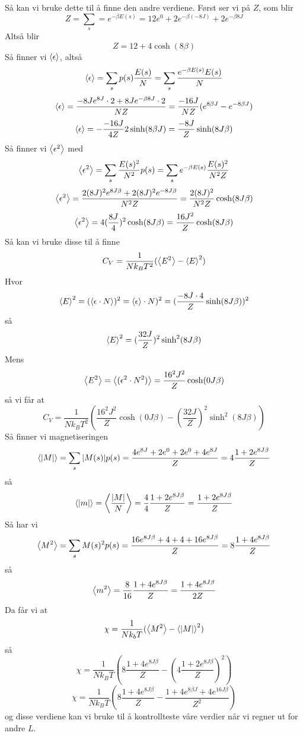 \documentclass[reprint,english,notitlepage]{revtex4-2}  %
\begin{document}
Så kan vi bruke dette til å finne den andre verdiene. Først ser vi på $Z$, som blir 
$$
Z=\sum_s=e^{-\beta E(s)}=12 e^{0}+2e^{-\beta (-8J)}+2e^{-\beta 8J}$$
Altså blir $$Z=12+4\cosh(8\beta)
$$
Så finner vi $\expval{\epsilon}$, altså
$$
\expval{\epsilon}=\sum_{s}p(s)\frac{E(s)}{N}=\sum_{s}\frac{e^{-\beta E(s)}E(s)}{N}
$$
$$
\expval{\epsilon}=\frac{-8Je^{8J}\cdot 2 + 8Je^{-\beta 8J}\cdot 2}{NZ}=\frac{-16J}{NZ}(e^{8\beta J}-e^{-8\beta J})$$$$\expval{\epsilon}=-\frac{-16 J}{4Z}2\sinh(8\beta J)=\frac{-8J}{Z}\sinh(8J\beta)
$$
Så finner vi $\expval{\epsilon^2}$ med 
$$
\expval{\epsilon^2}=\sum_{s}\frac{E(s)^2}{N^2}p(s)=\sum_{s}e^{-\beta E(s)}\frac{E(s)^2}{N^2Z}
$$
$$
\expval{\epsilon^2}=\frac{2(8J)^2e^{8J\beta}+2(8J)^2e^{-8J\beta}}{N^2Z}=\frac{2(8J)^2}{N^2Z}\cosh(8J\beta)
$$
$$
\expval{\epsilon^2}=4(\frac{8J}{4})^2\cosh(8J\beta)=\frac{16J^2}{Z}\cosh(8J\beta)
$$
Så kan vi bruke disse til å finne
$$
C_V=\frac{1}{Nk_BT^2}(\expval{E^2}-\expval{E}^2)
$$
Hvor 
$$\expval{E}^2=(\expval{\epsilon\cdot N})^2=\expval{\epsilon}\cdot N)^2=(\frac{-8J\cdot 4}{Z}\sinh(8J\beta))^2$$så $$\expval{E}^2=(\frac{32J}{Z})^2\sinh^2(8J\beta)
$$
Mens
$$
\expval{E^2}=\expval{(\epsilon^2\cdot N^2)}=\frac{16^2J^2}{Z}\cosh(0J\beta)
$$
så vi får at
$$
C_V=\frac{1}{Nk_BT^2}(\frac{16^2J^2}{Z}\cosh(0J\beta)-(\frac{32J}{Z})^2\sinh^2(8J\beta))
$$
Så finner vi magnetiseringen
$$
\expval{|M|}=\sum_s |M(s)|p(s)=\frac{4e^{8J}+2e^0 +2e^0 +4e^{8J}}{Z}=4\frac{1+2e^{8J\beta}}{Z}
$$
så 
$$
\expval{|m|}=\expval{\frac{|M|}{N}}=\frac{4}{4}\frac{1+2e^{8J\beta}}{Z}=\frac{1+2e^{8J\beta}}{Z}
$$
Så har vi
$$
\expval{M^2}=\sum_s M(s)^2p(s)=\frac{16e^{8J\beta}+4+4+16e^{8J\beta}}{Z}=8\frac{1+4e^{8J\beta}}{Z}
$$
så
$$
\expval{m^2}=\frac{8}{16}\frac{1+4e^{8J\beta}}{Z}=\frac{1+4e^{8J\beta}}{2Z}
$$
Da får vi at
$$
\chi=\frac{1}{Nk_bT}(\expval{M^2}-\expval{|M|}^2)
$$
så 
$$
\chi=\frac{1}{Nk_BT}(8\frac{1+4e^{8J\beta}}{Z}-(4\frac{1+2e^{8J\beta}}{Z})^2)
$$
$$
\chi=\frac{1}{Nk_BT}(8\frac{1+4e^{8J\beta}}{Z}-\frac{1+4e^{8\beta J}+4e^{16J\beta}}{Z^2})
$$
og disse verdiene kan vi bruke til å kontrollteste våre verdier når vi regner ut for andre $L$.
\end{document}
